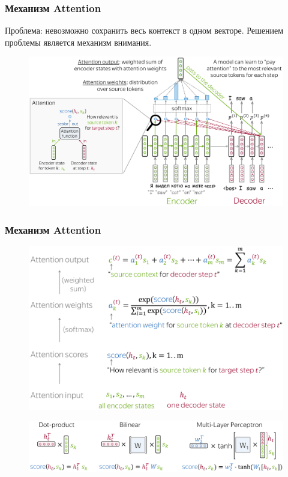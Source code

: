 \documentclass[notheorems, handout]{beamer}
\begin{document}
	\begin{frame}
	\frametitle{Механизм Attention}
		Проблема: невозможно сохранить весь контекст в одном векторе. Решением проблемы является механизм внимания.
		\begin{figure}[H]
			\begin{center}
				\includegraphics[scale=0.15]{img/general_scheme_att.png}
			\end{center}
		\end{figure}		
	\end{frame}
	
	\begin{frame}
	\frametitle{Механизм Attention}
		\begin{figure}[H]
			\begin{center}
				\includegraphics[scale=0.1]{img/att.png}
			\end{center}
		\end{figure}
		\begin{figure}[H]
			\begin{center}
				\includegraphics[scale=0.1]{img/att2.png}
			\end{center}
		\end{figure}
	\end{frame}
	
\end{document}
